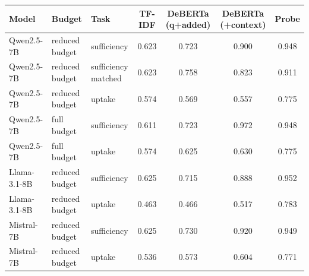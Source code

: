 \begin{tabular}{lllcccc}
\toprule
Model & Budget & Task & TF-IDF & DeBERTa (q+added) & DeBERTa (+context) & Probe \\
\midrule
Qwen2.5-7B & reduced budget & sufficiency & 0.623 & 0.723 & 0.900 & 0.948 \\
Qwen2.5-7B & reduced budget & sufficiency matched & 0.623 & 0.758 & 0.823 & 0.911 \\
Qwen2.5-7B & reduced budget & uptake & 0.574 & 0.569 & 0.557 & 0.775 \\
Qwen2.5-7B & full budget & sufficiency & 0.611 & 0.723 & 0.972 & 0.948 \\
Qwen2.5-7B & full budget & uptake & 0.574 & 0.625 & 0.630 & 0.775 \\
Llama-3.1-8B & reduced budget & sufficiency & 0.625 & 0.715 & 0.888 & 0.952 \\
Llama-3.1-8B & reduced budget & uptake & 0.463 & 0.466 & 0.517 & 0.783 \\
Mistral-7B & reduced budget & sufficiency & 0.625 & 0.730 & 0.920 & 0.949 \\
Mistral-7B & reduced budget & uptake & 0.536 & 0.573 & 0.604 & 0.771 \\
\bottomrule
\end{tabular}